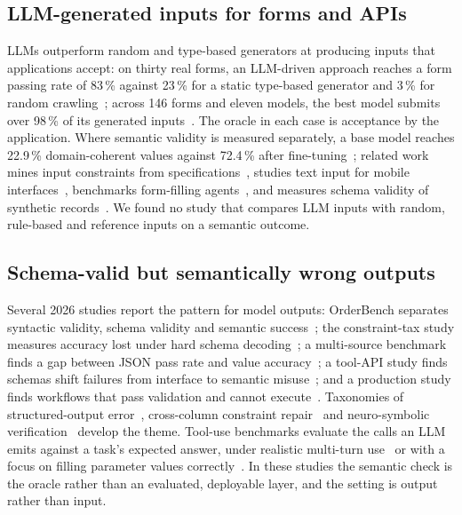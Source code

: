 \documentclass[conference]{IEEEtran}
\begin{document}
\subsection{LLM-generated inputs for forms and APIs}
LLMs outperform random and type-based generators at producing inputs that applications accept: on
thirty real forms, an LLM-driven approach reaches a form passing rate of 83\,\% against 23\,\% for a
static type-based generator and 3\,\% for random crawling~\cite{alian2024formnexus}; across 146 forms
and eleven models, the best model submits over 98\,\% of its generated inputs~\cite{li2026webformtest}.
The oracle in each case is acceptance by the application. Where semantic validity is measured
separately, a base model reaches 22.9\,\% domain-coherent values against 72.4\,\% after
fine-tuning~\cite{kim2025llamaresttest}; related work mines input constraints from
specifications~\cite{kim2024restgpt,huynh2024constraints}, studies text input for mobile
interfaces~\cite{cui2024guitextinput}, benchmarks form-filling agents~\cite{li2025formfactory}, and
measures schema validity of synthetic records~\cite{mishra2026structuredsynthetic}. We found no study
that compares LLM inputs with random, rule-based and reference inputs on a semantic outcome.

\subsection{Schema-valid but semantically wrong outputs}
Several 2026 studies report the pattern for model outputs: OrderBench separates syntactic validity,
schema validity and semantic success~\cite{li2026orderbench}; the constraint-tax study measures accuracy
lost under hard schema decoding~\cite{ray2026constrainttax}; a multi-source benchmark finds a gap
between JSON pass rate and value accuracy~\cite{singh2026sob}; a tool-API study finds schemas shift
failures from interface to semantic misuse~\cite{sigdel2026schemafirst}; and a production study finds
workflows that pass validation and cannot execute~\cite{wrenn2026enterprise}. Taxonomies of
structured-output error~\cite{song2026structuredoutput}, cross-column constraint
repair~\cite{zhao2026constraintaware} and neuro-symbolic verification~\cite{sigloch2026neurosymbolic}
develop the theme. Tool-use benchmarks evaluate the calls an LLM emits against a task's expected
answer, under realistic multi-turn use~\cite{yu2026wildtoolbench} or with a focus on filling parameter
values correctly~\cite{yu2026parambench}. In these studies the semantic check is the oracle rather than
an evaluated, deployable layer, and the setting is output rather than input.
\end{document}
